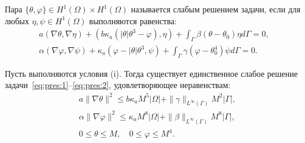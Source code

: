 \begin{frame}
    \begin{definition}
        Пара
        $\{\theta, \varphi\} \in H^1(\Omega) \times H^1(\Omega)$ называется слабым решением задачи,
        если для любых $\eta, \psi \in H^1(\Omega)$ выполняются равенства:
        \begin{gather*}
            a(\nabla \theta, \nabla \eta)
            + \left(b \kappa_{a}\left(|\theta| \theta^{3} - \varphi\right), \eta\right)
            + \int_{\Gamma} \beta\left(\theta - \theta_{0}\right) \eta d \Gamma=0, \\
            \alpha(\nabla \varphi, \nabla \psi)+\kappa_{a}\left(\varphi-|\theta| \theta^{3},
            \psi\right)+\int_{\Gamma} \gamma\left(\varphi-\theta_{0}^{4}\right) \psi d \Gamma=0.
        \end{gather*}
    \end{definition}
    \begin{theorem}[Chebotarev, 2015]
        Пусть выполняются условия (i).
        Тогда существует единственное слабое
        решение задачи~\eqref{eq:pres:1}--\eqref{eq:pres:2},
        удовлетворяющее неравенствам:
        \begin{align}
            & a\|\nabla \theta\|^{2} \leqslant b \kappa_{a} M^{5}|\Omega|
            + \|\gamma\|_{L^{\infty}(\Gamma)} M^{2}|\Gamma|,\\
            & \alpha\|\nabla \varphi\|^{2} \leqslant \kappa_{a} M^{8}|\Omega|
            + \|\beta\|_{L^{\infty}(\Gamma)} M^{8}|\Gamma|,\\
            & 0 \leqslant \theta \leqslant M, \quad 0 \leqslant \varphi \leqslant M^{4}.
        \end{align}
    \end{theorem}
\end{frame}

